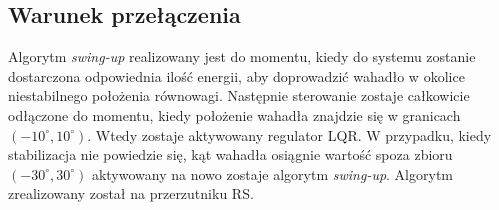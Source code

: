 \subsection{Warunek przełączenia}
Algorytm \textit{swing-up} realizowany jest do momentu, kiedy do systemu zostanie dostarczona odpowiednia ilość energii, aby doprowadzić wahadło w okolice niestabilnego położenia równowagi.
Następnie sterowanie zostaje całkowicie odłączone do momentu, kiedy położenie wahadła znajdzie się w granicach $(-10^\circ,10^\circ)$. Wtedy zostaje aktywowany regulator LQR. W przypadku, kiedy stabilizacja nie powiedzie się, kąt wahadła osiągnie wartość spoza zbioru $(-30^\circ,30^\circ)$ aktywowany na nowo zostaje algorytm \textit{swing-up}. Algorytm zrealizowany został na przerzutniku RS.
\begin{figure}[H]
	\centering
	~~
	

\end{figure}
